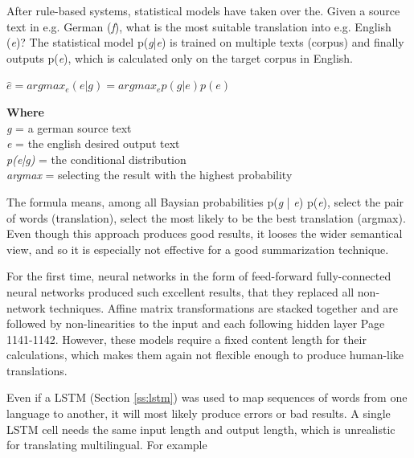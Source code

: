After rule-based systems, statistical models have taken over the. Given a source text in e.g. German (\textit{f}), what is the most suitable translation into e.g. English (\textit{e})? The statistical model p(\textit{g}|\textit{e}) is trained on multiple texts (corpus) and finally outputs p(\textit{e}), which is calculated only on the target corpus in English. 

\begin{tcolorbox}
	\begin{center}
		\begin{math}
		\hat{e} = argmax_{e}(e | g) = argmax_{e} p(g | e) p(e)
		\label{eq:rule}
		\end{math}
	\end{center}
\end{tcolorbox}

\begin{tcolorbox}
	\textbf{Where} \\
	\textit{g} = a german source text \\
	\textit{e} = the english desired output text \\
	\textit{p(e|g)} = the conditional distribution \\
	\textit{argmax} = selecting the result with the highest probability
\end{tcolorbox}

The formula means, among all Baysian probabilities p(\textit{g} | \textit{e}) p(\textit{e}), select the pair of words (translation), select the most likely to be the best translation (argmax). Even though this approach produces good results, it looses the wider semantical view, and so it is especially not effective for a good summarization technique.

For the first time, neural networks in the form of feed-forward fully-connected neural networks produced such excellent results, that they replaced all non-network techniques. Affine matrix transformations are stacked together and are followed by non-linearities to the input and each following hidden layer \cite{Bengio} Page 1141-1142. However, these models require a fixed content length for their calculations, which makes them again not flexible enough to produce human-like translations.  

Even if a LSTM (Section \ref{ss:lstm}) was used to map sequences of words from one language to another, it will most likely produce errors or bad results. A single LSTM cell needs the same input length and output length, which is unrealistic for translating multilingual. For example

